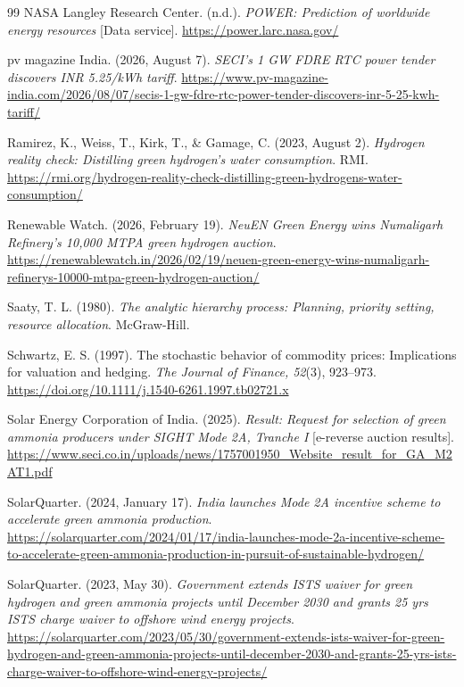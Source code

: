 {\begin{thebibliography}{99}
 NASA Langley Research Center. (n.d.). \emph{POWER: Prediction of worldwide energy resources} [Data service]. \url{https://power.larc.nasa.gov/}

 pv magazine India. (2026, August 7). \emph{SECI's 1 GW FDRE RTC power tender discovers INR 5.25/kWh tariff}. \url{https://www.pv-magazine-india.com/2026/08/07/secis-1-gw-fdre-rtc-power-tender-discovers-inr-5-25-kwh-tariff/}

 Ramirez, K., Weiss, T., Kirk, T., \& Gamage, C. (2023, August 2). \emph{Hydrogen reality check: Distilling green hydrogen's water consumption}. RMI. \url{https://rmi.org/hydrogen-reality-check-distilling-green-hydrogens-water-consumption/}

 Renewable Watch. (2026, February 19). \emph{NeuEN Green Energy wins Numaligarh Refinery's 10,000 MTPA green hydrogen auction}. \url{https://renewablewatch.in/2026/02/19/neuen-green-energy-wins-numaligarh-refinerys-10000-mtpa-green-hydrogen-auction/}

 Saaty, T. L. (1980). \emph{The analytic hierarchy process: Planning, priority setting, resource allocation}. McGraw-Hill.

 Schwartz, E. S. (1997). The stochastic behavior of commodity prices: Implications for valuation and hedging. \emph{The Journal of Finance, 52}(3), 923--973. \url{https://doi.org/10.1111/j.1540-6261.1997.tb02721.x}

 Solar Energy Corporation of India. (2025). \emph{Result: Request for selection of green ammonia producers under SIGHT Mode 2A, Tranche I} [e-reverse auction results]. \url{https://www.seci.co.in/uploads/news/1757001950_Website_result_for_GA_M2AT1.pdf}

 SolarQuarter. (2024, January 17). \emph{India launches Mode 2A incentive scheme to accelerate green ammonia production}. \url{https://solarquarter.com/2024/01/17/india-launches-mode-2a-incentive-scheme-to-accelerate-green-ammonia-production-in-pursuit-of-sustainable-hydrogen/}

 SolarQuarter. (2023, May 30). \emph{Government extends ISTS waiver for green hydrogen and green ammonia projects until December 2030 and grants 25 yrs ISTS charge waiver to offshore wind energy projects}. \url{https://solarquarter.com/2023/05/30/government-extends-ists-waiver-for-green-hydrogen-and-green-ammonia-projects-until-december-2030-and-grants-25-yrs-ists-charge-waiver-to-offshore-wind-energy-projects/}


\end{thebibliography}}
